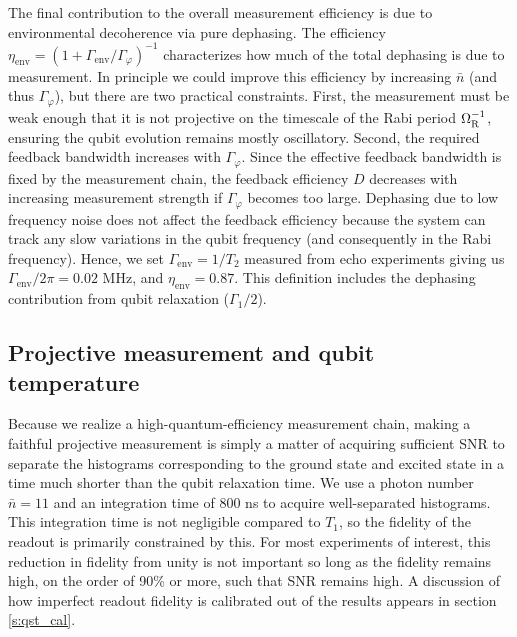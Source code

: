  The final contribution to the overall measurement efficiency is due to environmental decoherence via pure dephasing. The efficiency $\eta_{\mathrm{env}} = (1+\Gamma_{\mathrm{env}} / \Gamma_{\varphi})^{-1}$ characterizes how much of the total dephasing is due to measurement. In principle we could improve this efficiency by increasing $\bar{n}$ (and thus $\Gamma_{\varphi}$), but there are two practical constraints. First, the measurement must be weak enough that it is not projective on the timescale of the Rabi period $\Omega_{\rm R}^{-1}$, ensuring the qubit evolution remains mostly oscillatory. Second, the required feedback bandwidth increases with $\Gamma_{\varphi}$. Since the effective feedback bandwidth is fixed by the measurement chain, the feedback efficiency $D$ decreases with increasing measurement strength if $\Gamma_{\varphi}$ becomes too large.  Dephasing due to low frequency noise does not affect the feedback efficiency because the system can track any slow variations in the qubit frequency (and consequently in the Rabi frequency). Hence, we set $\Gamma_{\mathrm{env}} = 1/T_2$ measured from echo experiments giving us $\Gamma_{\mathrm{env}}/2\pi = 0.02$ MHz, and $\eta_{\mathrm{env}}=0.87$.  This definition includes the dephasing contribution from qubit relaxation ($\Gamma_1 / 2$).


\subsection{Projective measurement and qubit temperature}

Because we realize a high-quantum-efficiency measurement chain, making a faithful projective measurement is simply a matter of acquiring sufficient SNR to separate the histograms corresponding to the ground state and excited state in a time much shorter than the qubit relaxation time.  We use a photon number $\bar{n} = 11$ and an integration time of 800 ns to acquire well-separated histograms.  This integration time is not negligible compared to $T_1$, so the fidelity of the readout is primarily constrained by this.  For most experiments of interest, this reduction in fidelity from unity is not important so long as the fidelity remains high, on the order of 90\% or more, such that SNR remains high.  A discussion of how imperfect readout fidelity is calibrated out of the results appears in section \ref{s:qst_cal}.

